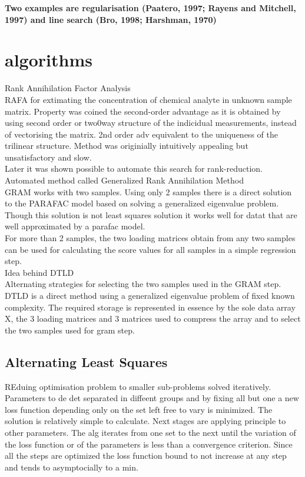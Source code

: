 \documentclass[10pt, draft]{article}
\begin{document}
 \textbf{Two examples are regularisation (Paatero, 1997; Rayens and Mitchell, 1997) and line search (Bro, 1998; Harshman, 1970) }
 
 \section{algorithms}
 
 Rank Annihilation Factor Analysis\\
 RAFA for extimating the concentration of chemical analyte in unknown sample matrix.  Property was coined the second-order advantage as it is obtained by using second order or two0way structure of the indicidual measurements, instead of vectorising the matrix.  2nd order adv equivalent to the uniqueness of the trilinear structure.  Method was originially intuitively appealing but unsatisfactory and slow.  \\
 Later it was shown possible to automate this search for rank-reduction.  \\
 Automated method called Generalized Rank Annihilation Method\\
 GRAM works with two samples.  Using only 2 samples there is a direct solution to the PARAFAC model based on solving a generalized eigenvalue problem.  Though this solution is not least squares solution it works well for datat that are well approximated by a parafac model.  \\
 For more than 2 samples, the two loading matrices obtain from any two samples can be used for calculating the score values for all samples in a simple regression step.  \\
 Idea behind DTLD\\
 Alternating strategies for selecting the two samples used in the GRAM step.  DTLD is a direct method using a generalized eigenvalue problem of fixed known complexity.  The required storage is represented in essence by the sole data array X, the 3 loading matrices and 3 matrices used to compress the array and to select the two samples used for gram step.
 
 \subsection{Alternating Least Squares}
 
 REduing optimisation problem to smaller sub-problems solved iteratively.  Parameters to de det separated in diffeent groups and by fixing all but one a new loss function depending only on the set left free to vary is minimized.  The solution is relatively simple to calculate.  Next stages are applying principle to other parameters.  The alg iterates from one set to the next until the variation of the loss function or of the parameters is less than a convergence criterion.  Since all the steps are optimized the loss function bound to not increase at any step and tends to asymptocially to a min.
 
\end{document}
